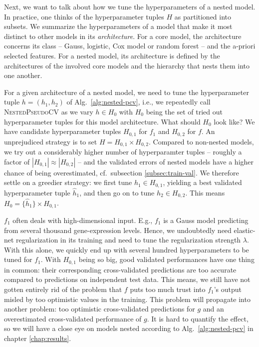 Next, we want to talk about how we tune the hyperparameters of a nested model. In practice, one thinks of 
the hyperparameter tuples $H$ as partitioned into subsets. We summarize the
hyperparameters of a model that make it most distinct to other models in its \textit{architecture}. 
For a core model, the architecture concerns its class -- Gauss, logistic, Cox model or random forest 
-- and the a-priori selected features. For a nested model, its architecture is defined by the 
architectures of the involved core models and the hierarchy that nests them into one another.

For a given architecture of a nested model, we need to tune the hyperparameter tuple $h = (h_1, h_2)$ 
of 
Alg.\ \ref{alg:nested-pcv}, i.e., we repeatedly call \textsc{NestedPseudoCV} as we vary $h \in H_0$
with $H_0$ being the set of tried out hyperparameter tuples for this model architecture. What 
should $H_0$ look like? We have candidate 
hyperparameter tuples $H_{0, 1}$ for $f_1$ and $H_{0, 2}$ for $f$. An unprejudiced strategy is to 
set $H = H_{0, 1} \times H_{0, 2}$. Compared to non-nested models, we try out a considerably 
higher number of hyperparamter tuples -- roughly a factor of $|H_{0, 1}| \approx |H_{0, 2}|$ -- and 
the validated errors of nested models have a higher chance 
of being overestimated, cf.\ subsection \ref{subsec:train-val}. We therefore settle on a greedier 
strategy: we first tune $h_1 \in H_{0, 1}$, yielding a best validated hyperparameter tuple 
$\hat{h}_1$, and then go on to tune $h_2 \in H_{0, 2}$. This means $H_0 = \{ \hat{h}_1 \} 
\times H_{0, 1}$.

$f_1$ often deals with high-dimensional input. E.g., $f_1$ is a Gauss model 
predicting from 
several thousand gene-expression levels. Hence, we undoubtedly need elastic-net 
regularization in its training and need to tune the regularization strength $\lambda$. 
With this alone, we quickly end up with several hundred hyperparameters to be tuned for $f_1$. 
With $H_{0,1}$ being so big, good validated performances have one thing in common: their
corresponding cross-validated predictions are too accurate compared to predictions on independent 
test data. This means, we still 
have not gotten entirely rid of the problem that $f$ puts too much trust into $f_1$'s output 
misled by too optimistic values in the training. This problem will propagate into another
problem: too optimistic cross-validated predictions for $g$ and an overestimated 
cross-validated performance of $g$. It is hard to quantify the effect, so we will have a close 
eye on models nested according to Alg.\ \ref{alg:nested-pcv} in chapter \ref{chap:results}. 


